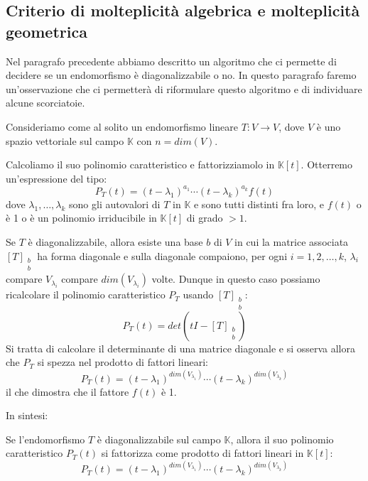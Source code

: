 
\subsection{Criterio di molteplicit\`a algebrica e molteplicit\`a geometrica}
Nel paragrafo precedente abbiamo descritto un algoritmo che ci permette di decidere
se un endomorfismo \`e diagonalizzabile o no. In questo paragrafo faremo
un'osservazione che ci permetter\`a di riformulare questo algoritmo e di individuare
alcune scorciatoie.

Consideriamo come al solito un endomorfismo lineare $T : V \to V$, dove $V$ \`e uno
spazio vettoriale sul campo $\mathbb{K}$ con $n = dim(V)$.

Calcoliamo il suo polinomio caratteristico e fattorizziamolo in $\mathbb{K}[t]$.
Otterremo un'espressione del tipo:
\begin{equation*}
	P_T(t) = (t - \lambda_1)^{a_1} \cdots (t - \lambda_k)^{a_k} f(t)
\end{equation*}
dove $\lambda_1, \dots, \lambda_k$ sono gli autovalori di $T$ in $\mathbb{K}$ e sono
tutti distinti fra loro, e $f(t)$ o \`e 1 o \`e un polinomio irriducibile in
$\mathbb{K}[t]$ di grado $> 1$.

Se $T$ \`e diagonalizzabile, allora esiste una base $b$ di $V$ in cui la matrice
associata $[T]_{\substack{b \\ b}}$ ha forma diagonale e sulla diagonale compaiono,
per ogni $i = 1, 2, \dots, k$, $\lambda_i$ compare $V_{\lambda_i}$ compare
$dim(V_{\lambda_i})$ volte. Dunque in questo caso possiamo ricalcolare il polinomio
caratteristico $P_T$ usando $[T]_{\substack{b \\ b}}$:
\begin{equation*}
	P_T(t) = det(tI - [T]_{\substack{b \\ b}})
\end{equation*}
Si tratta di calcolare il determinante di una matrice diagonale e si osserva allora
che $P_T$ si spezza nel prodotto di fattori lineari:
\begin{equation*}
	P_T(t) = (t - \lambda_1)^{dim(V_{\lambda_1})} \cdots
	(t - \lambda_k)^{dim(V_{\lambda_k})}
\end{equation*}
il che dimostra che il fattore $f(t)$ \`e 1.

In sintesi:
\begin{proposition}
	Se l'endomorfismo $T$ \`e diagonalizzabile sul campo $\mathbb{K}$, allora il suo
	polinomio caratteristico $P_T(t)$ si fattorizza come prodotto di fattori lineari
	in $\mathbb{K}[t]$:
	\begin{equation*}
		P_T(t) = (t - \lambda_1)^{dim(V_{\lambda_1})} \cdots
		(t - \lambda_k)^{dim(V_{\lambda_k})}
	\end{equation*}
\end{proposition}

